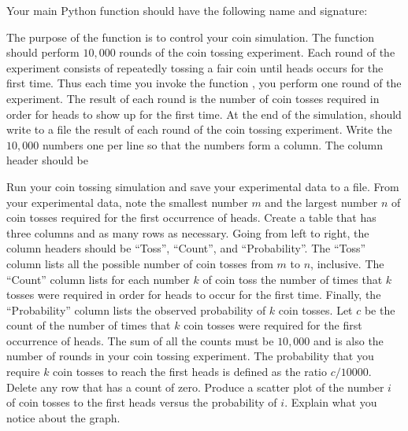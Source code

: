 \documentclass[a4paper,oneside,12pt]{article}
\begin{document}
\begin{problem}
\begin{packedenum}
  \item\label{subprob:coin_simulation_main}
    Your main Python function should have the following name and
    signature:
    \begin{center}
    \end{center}
    The purpose of the function  is to control your coin
    simulation.  The function should perform $10,000$ rounds of the
    coin tossing experiment.  Each round of the experiment consists of
    repeatedly tossing a fair coin until heads occurs for the first
    time.  Thus each time you invoke the function
    , you perform one round of the
    experiment.  The result of each round is the number of coin tosses
    required in order for heads to show up for the first time.  At the
    end of the simulation,  should write to a file the
    result of each round of the coin tossing experiment.  Write the
    $10,000$ numbers one per line so that the numbers form a column.
    The column header should be
    \begin{center}
    \end{center}

  \item\label{subprob:coin_simulation_frequency_distribution}
    Run your coin tossing simulation and save your experimental data
    to a file.  From your experimental data, note the smallest number
    $m$ and the largest number $n$ of coin tosses required for the
    first occurrence of heads.  Create a table that has three columns
    and as many rows as necessary.  Going from left to right, the
    column headers should be ``Toss'', ``Count'', and
    ``Probability''.  The ``Toss'' column lists all the possible
    number of coin tosses from $m$ to $n$, inclusive.  The ``Count''
    column lists for each number $k$ of coin toss the number of times
    that $k$ tosses were required in order for heads to occur for the
    first time.  Finally, the ``Probability'' column lists the
    observed probability of $k$ coin tosses.  Let $c$ be the count of
    the number of times that $k$ coin tosses were required for the
    first occurrence of heads.  The sum of all the counts must be
    $10,000$ and is also the number of rounds in your coin tossing
    experiment.  The probability that you require $k$ coin tosses to
    reach the first heads is defined as the ratio $c / 10000$.  Delete
    any row that has a count of zero.  Produce a scatter plot of the
    number $i$ of coin tosses to the first heads versus the
    probability of $i$.  Explain what you notice about the graph.


\end{packedenum}
\end{problem}
\end{document}
